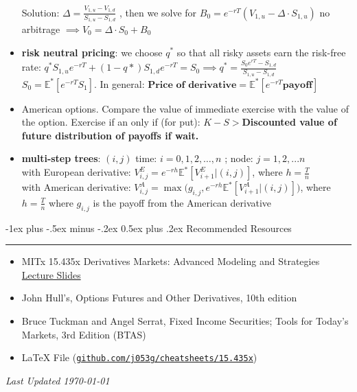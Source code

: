\documentclass[10pt,landscape,a4paper]{article}
\makeatletter
\renewcommand{\section}{\@startsection{section}{1}{0mm}%
                                {-1ex plus -.5ex minus -.2ex}%
                                {0.5ex plus .2ex}%
                                {\normalfont\large\bfseries}}
\makeatother
\begin{document}
\begin{multicols*}{3}
\begin{description}[topsep=0pt]
\begin{itemize}[topsep=0pt]
 		Solution: $\Delta = \frac{ V_{1,u}- V_{1,d}}{S_{1,u}-S_{1,d}}$ , then we solve for $B_0=e^{-rT}(V_{1,u}-\Delta \cdot  S_{1,u})$
 		no arbitrage $\implies V_0= \Delta  \cdot S_0 + B_0$
 		\item \textbf{risk neutral pricing}: we choose $q^*$ so that all risky assets earn the risk-free rate:
 		$q^*S_{1,u} e^{-rT} + (1-q*)S_{1,d}e^{-rT}=S_0 \implies q^* = \frac{S_0 e^{rT}-S_{1,d}}{S_{1,u}-S_{1,d}}$ \\
 		$S_0 = \mathbb{E}^*[ e^{-rT} S_1]$. In general: $\textbf{Price of derivative} = \mathbb{E}^*[e^{-rT} \textbf{payoff}]$
 		\item American options.  Compare the value of immediate exercise with the value of the option. Exercise if an only if (for put): \textbf{ $K-S>$Discounted value of future distribution of payoffs if wait.}
 		\item \textbf{multi-step trees}:  $(i,j)$ time: $i=0,1,2,\dots, n$ ; node: $j=1,2,...n$ \\
 		with European derivative: $V^E_{i,j} = e^{-rh} \mathbb{E}^*[V^E_{i+1}|(i,j)]$, where $h=\frac{T}{n}$ \\
 		with American derivative: $V^A_{i,j} = \operatorname{max} \Big(g_{i,j}, e^{-rh} \mathbb{E}^*[V^A_{i+1}|(i,j)]\Big)$, where $h=\frac{T}{n}$ where $g_{i,j}$ is the payoff from the American derivative\\
 		
 		
 	\end{itemize}
 \end{description}
 
\newpage

\section{Recommended Resources} \smallskip \hrule height 1pt \smallskip

\bigskip

\begin{itemize}
\item MITx 15.435x 
Derivatives Markets: Advanced Modeling and Strategies \href{https://learning.edx.org/course/course-v1:MITx+15.435x+1T2021/home}{Lecture Slides}

\item John Hull’s, Options Futures and Other Derivatives, 10th edition
\item Bruce Tuckman and Angel Serrat, Fixed Income Securities; Tools for Today’s Markets, 3rd Edition (BTAS) 
\item LaTeX File (\texttt{\href{https://github.com/j053g/cheatsheets/blob/main/15.435x/15.435x_derivatives_markets.tex}{github.com/j053g/cheatsheets/15.435x}})
\end{itemize}



\begin{center}
	\emph{Last Updated \today}
\end{center}

\end{multicols*}
\end{document}
